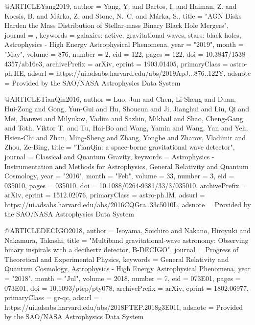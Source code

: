 \documentclass[twocolumn,tighten]{aastex63}
\begin{document}
@ARTICLE{Yang2019,
       author = {{Yang}, Y. and {Bartos}, I. and {Haiman}, Z. and {Kocsis}, B. and
         {M{\'a}rka}, Z. and {Stone}, N.~C. and {M{\'a}rka}, S.},
        title = "{AGN Disks Harden the Mass Distribution of Stellar-mass Binary Black Hole Mergers}",
      journal = {\apj},
     keywords = {galaxies: active, gravitational waves, stars: black holes, Astrophysics - High Energy Astrophysical Phenomena},
         year = "2019",
        month = "May",
       volume = {876},
       number = {2},
          eid = {122},
        pages = {122},
          doi = {10.3847/1538-4357/ab16e3},
archivePrefix = {arXiv},
       eprint = {1903.01405},
 primaryClass = {astro-ph.HE},
       adsurl = {https://ui.adsabs.harvard.edu/abs/2019ApJ...876..122Y},
      adsnote = {Provided by the SAO/NASA Astrophysics Data System}
}

@ARTICLE{TianQin2016,
       author = {{Luo}, Jun and {Chen}, Li-Sheng and {Duan}, Hui-Zong and
         {Gong}, Yun-Gui and {Hu}, Shoucun and {Ji}, Jianghui and {Liu}, Qi and
         {Mei}, Jianwei and {Milyukov}, Vadim and {Sazhin}, Mikhail and
         {Shao}, Cheng-Gang and {Toth}, Viktor T. and {Tu}, Hai-Bo and
         {Wang}, Yamin and {Wang}, Yan and {Yeh}, Hsien-Chi and
         {Zhan}, Ming-Sheng and {Zhang}, Yonghe and {Zharov}, Vladimir and
         {Zhou}, Ze-Bing},
        title = "{TianQin: a space-borne gravitational wave detector}",
      journal = {Classical and Quantum Gravity},
     keywords = {Astrophysics - Instrumentation and Methods for Astrophysics, General Relativity and Quantum Cosmology},
         year = "2016",
        month = "Feb",
       volume = {33},
       number = {3},
          eid = {035010},
        pages = {035010},
          doi = {10.1088/0264-9381/33/3/035010},
archivePrefix = {arXiv},
       eprint = {1512.02076},
 primaryClass = {astro-ph.IM},
       adsurl = {https://ui.adsabs.harvard.edu/abs/2016CQGra..33c5010L},
      adsnote = {Provided by the SAO/NASA Astrophysics Data System}
}

@ARTICLE{DECIGO2018,
       author = {{Isoyama}, Soichiro and {Nakano}, Hiroyuki and {Nakamura}, Takashi},
        title = "{Multiband gravitational-wave astronomy: Observing binary inspirals with a decihertz detector, B-DECIGO}",
      journal = {Progress of Theoretical and Experimental Physics},
     keywords = {General Relativity and Quantum Cosmology, Astrophysics - High Energy Astrophysical Phenomena},
         year = "2018",
        month = "Jul",
       volume = {2018},
       number = {7},
          eid = {073E01},
        pages = {073E01},
          doi = {10.1093/ptep/pty078},
archivePrefix = {arXiv},
       eprint = {1802.06977},
 primaryClass = {gr-qc},
       adsurl = {https://ui.adsabs.harvard.edu/abs/2018PTEP.2018g3E01I},
      adsnote = {Provided by the SAO/NASA Astrophysics Data System}
}
\end{document}
